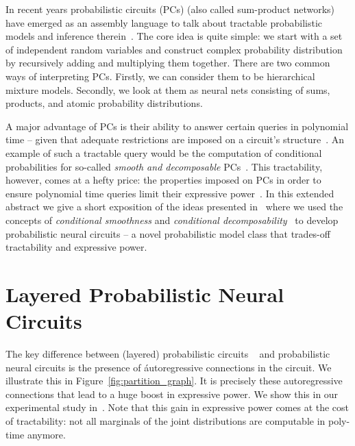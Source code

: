 \documentclass[
]{ceurart}
\begin{document}
In recent years probabilistic circuits (PCs) (also called sum-product networks)~\citep{darwiche2003differential} have emerged as an assembly language to talk about tractable probabilistic models and inference therein~\citep{vergari2021compositional}. The core idea is quite simple: we start with a set of independent random variables and construct complex probability distribution by recursively adding and multiplying them together.
There are two common ways of interpreting PCs. Firstly, we can consider them to be hierarchical mixture models. Secondly, we look at them as neural nets consisting of sums, products, and atomic probability distributions.

A major advantage of PCs is their ability to answer certain queries in polynomial time -- given that adequate restrictions are imposed on a circuit's structure~\citep{vergari2021compositional}. An example of such a tractable query would be the computation of conditional probabilities for so-called \textit{smooth and decomposable} PCs~\citep{darwiche2001decomposable,darwiche2003differential}.
This tractability, however, comes at a hefty price: the properties imposed on PCs in order to ensure polynomial time queries limit their expressive power~\citep{martens2014expressive,sharir2018sum}.
In this extended abstract we give a short exposition of the ideas presented in~\citep{zuidberg2024probabilistic} where we used the concepts of \textit{conditional smoothness} and \textit{conditional decomposability}~\citep{sharir2018sum}
to develop probabilistic neural circuits -- a novel probabilistic model class that trades-off tractability and expressive power.








\section{Layered Probabilistic Neural Circuits}

The key difference between (layered) probabilistic circuits ~\citep{peharz2020einsum} and probabilistic neural circuits is the presence of áutoregressive connections in the circuit. We illustrate this in Figure~\ref{fig:partition_graph}. It is precisely these autoregressive connections that lead to a huge boost in expressive power. We show this in our experimental study in~\citep{zuidberg2024probabilistic}. Note that this gain in expressive power comes at the cost of tractability: not all marginals of the joint distributions are computable in poly-time anymore.
\end{document}
